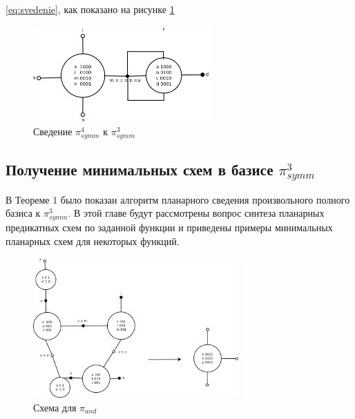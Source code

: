 \documentclass[12pt]{article}
\begin{document}
\ref{eq:svedenie}, как показано на рисунке \ref{fig:4to3}
\begin{figure}[htb]
 \centering
\includegraphics[width=0.6\textwidth]{4to3.png}
\caption{Сведение $\pi_{symm}^4$ к $\pi_{symm}^3$ }
\label{fig:4to3}
\end{figure}



\clearpage
\subsection{Получение минимальных схем в базисе $\pi_{symm}^3$}
В Теореме 1 было показан алгоритм планарного сведения произвольного полного базиса к $\pi_{symm}^3$. 
В этой главе будут рассмотрены вопрос синтеза планарных предикатных схем по заданной функции и 
приведены примеры минимальных планарных схем для некоторых функций.


\begin{figure}[htb]
\centering
\includegraphics[width=0.7\textwidth]{min_and.png}
\caption{Схема для $\pi_{and}$}
\label{fig:and}
\end{figure}
\end{document}
